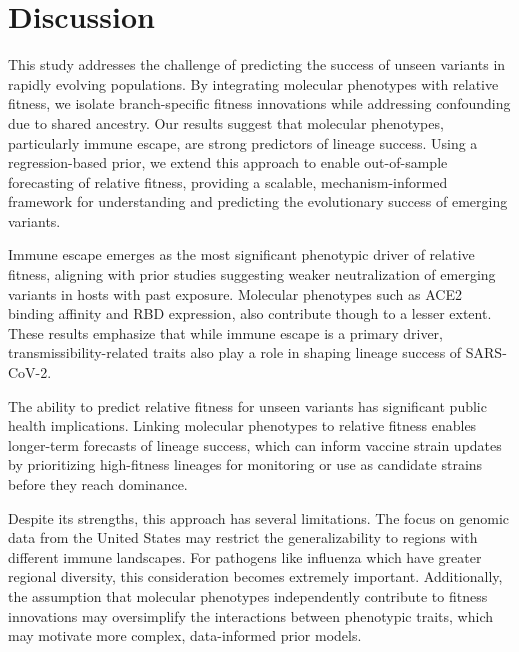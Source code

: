 \section{Discussion}

This study addresses the challenge of predicting the success of unseen variants in rapidly evolving populations.
By integrating molecular phenotypes with relative fitness, we isolate branch-specific fitness innovations while addressing confounding due to shared ancestry.
Our results suggest that molecular phenotypes, particularly immune escape, are strong predictors of lineage success.
Using a regression-based prior, we extend this approach to enable out-of-sample forecasting of relative fitness, providing a scalable, mechanism-informed framework for understanding and predicting the evolutionary success of emerging variants.

Immune escape emerges as the most significant phenotypic driver of relative fitness, aligning with prior studies suggesting weaker neutralization of emerging variants in hosts with past exposure.
Molecular phenotypes such as ACE2 binding affinity and RBD expression, also contribute though to a lesser extent.
These results emphasize that while immune escape is a primary driver, transmissibility-related traits also play a role in shaping lineage success of SARS-CoV-2.

The ability to predict relative fitness for unseen variants has significant public health implications.
Linking molecular phenotypes to relative fitness enables longer-term forecasts of lineage success, which can inform vaccine strain updates by prioritizing high-fitness lineages for monitoring or use as candidate strains before they reach dominance.


Despite its strengths, this approach has several limitations.
The focus on genomic data from the United States may restrict the generalizability to regions with different immune landscapes.
For pathogens like influenza which have greater regional diversity, this consideration becomes extremely important.
Additionally, the assumption that molecular phenotypes independently contribute to fitness innovations may oversimplify the interactions between phenotypic traits, which may motivate more complex, data-informed prior models.

